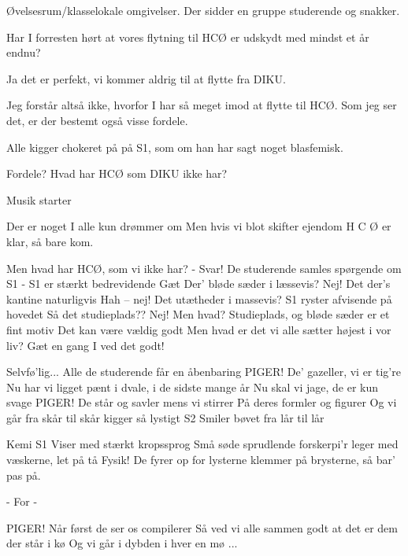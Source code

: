 \documentclass[a4paper,11pt]{article}
\begin{document}
\begin{song}
\scene Øvelsesrum/klasselokale omgivelser. Der sidder en gruppe studerende og snakker.

 Har I forresten hørt at vores flytning til HCØ er udskydt med mindst et år endnu?

 Ja det er perfekt, vi kommer aldrig til at flytte fra DIKU.

 Jeg forstår altså ikke, hvorfor I har så meget imod at flytte til HCØ. Som jeg ser det, er der bestemt også visse fordele.

 Alle kigger chokeret på på S1, som om han har sagt noget blasfemisk.

 Fordele? Hvad har HCØ som DIKU ikke har?

\scene Musik starter

 Der er noget I alle kun drømmer om
Men hvis vi blot skifter ejendom
H C Ø  er klar, så bare kom.

 Men hvad har HCØ, som vi ikke har? - Svar!
\scene De studerende samles spørgende om S1 - S1 er stærkt bedrevidende 
 Gæt
 Der' bløde sæder i læssevis?
 Nej!
 Det der's kantine naturligvis
 Hah – nej!
 Det utætheder i massevis?
\scene S1 ryster afvisende på hovedet
 Så det studieplads??
 Nej!
 Men hvad?
 Studieplads, og bløde sæder er et fint motiv
Det kan være vældig godt
Men hvad er det vi alle sætter højest i vor liv?
Gæt en gang I ved det godt!

Selvfø'lig...
\scene Alle de studerende får en åbenbaring
 PIGER!
 De' gazeller, vi er tig're
 Nu har vi ligget pænt i dvale, i de sidste mange år
 Nu skal vi jage, de er kun svage
 PIGER!
 De står og savler mens vi stirrer
 På deres formler og figurer
 Og vi går fra skår til skår
 kigger så lystigt
\scene S2 Smiler bøvet
 fra lår til lår

 Kemi
\scene S1 Viser med stærkt kropssprog
 Små søde sprudlende forskerpi'r
leger med væskerne, let på tå
 Fysik!
De fyrer op for lysterne
klemmer på brysterne, så bar' pas på.

 - For -

 PIGER!
 Når først de ser os compilerer
 Så ved vi alle sammen godt at det er dem der står i kø
 Og vi går i dybden i hver en mø ...


\end{song}
\end{document}
